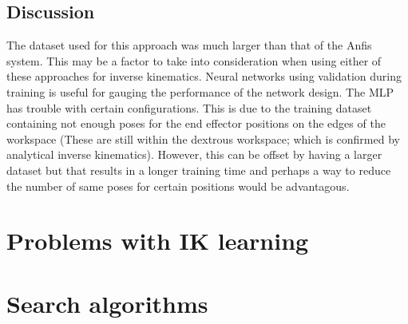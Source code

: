 \documentclass[a4paper,11pt]{article}
\begin{document}
\subsection{Discussion}

The dataset used for this approach was much larger than that of the Anfis system. This may be a factor to take into consideration when using either of these approaches for inverse kinematics.
Neural networks using validation during training is useful for gauging the performance of the network design.
The MLP has trouble with certain configurations. This is due to the training dataset containing not enough poses for the end effector positions on the edges of the workspace (These are still within the dextrous workspace; which is confirmed by analytical inverse kinematics). However, this can be offset by having a larger dataset but that results in a longer training time and perhaps a way to reduce the number of same poses for certain positions would be advantagous.




\section{Problems with IK learning}
\section{Search algorithms}






\clearpage

\end{document}

